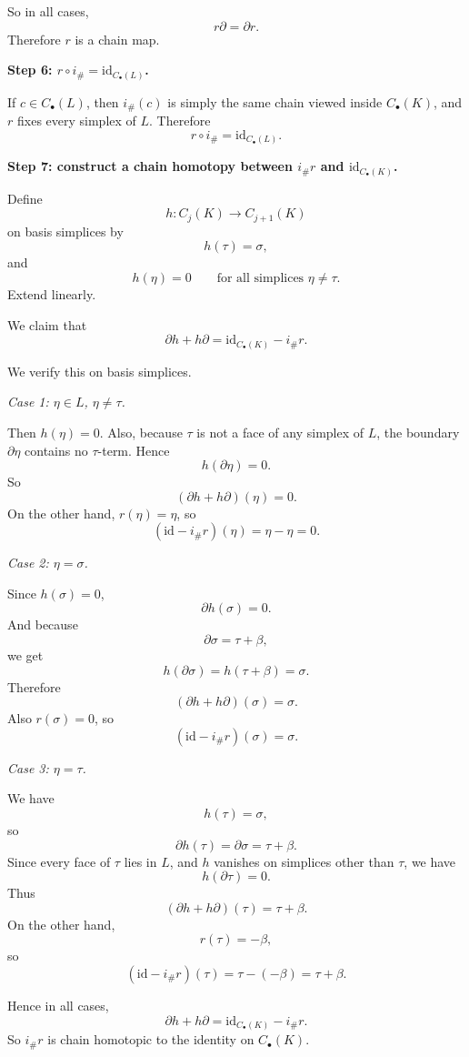 \documentclass[12pt,a4paper]{article}
\theoremstyle{notespace}
\begin{document}
So in all cases,
\[
r\partial=\partial r.
\]
Therefore \(r\) is a chain map.

\medskip

\textbf{Step 6: \(r\circ i_\#=\mathrm{id}_{C_\bullet(L)}\).}

If \(c\in C_\bullet(L)\), then \(i_\#(c)\) is simply the same chain viewed inside \(C_\bullet(K)\), and \(r\) fixes every simplex of \(L\). Therefore
\[
r\circ i_\# = \mathrm{id}_{C_\bullet(L)}.
\]

\medskip

\textbf{Step 7: construct a chain homotopy between \(i_\# r\) and \(\mathrm{id}_{C_\bullet(K)}\).}

Define
\[
h:C_j(K)\to C_{j+1}(K)
\]
on basis simplices by
\[
h(\tau)=\sigma,
\]
and
\[
h(\eta)=0
\qquad\text{for all simplices } \eta\neq \tau.
\]
Extend linearly.

We claim that
\[
\partial h + h\partial = \mathrm{id}_{C_\bullet(K)} - i_\# r.
\]

We verify this on basis simplices.

\medskip

\emph{Case 1: \(\eta\in L\), \(\eta\neq \tau\).}

Then \(h(\eta)=0\). Also, because \(\tau\) is not a face of any simplex of \(L\), the boundary \(\partial \eta\) contains no \(\tau\)-term. Hence
\[
h(\partial \eta)=0.
\]
So
\[
(\partial h+h\partial)(\eta)=0.
\]
On the other hand, \(r(\eta)=\eta\), so
\[
(\mathrm{id}-i_\# r)(\eta)=\eta-\eta=0.
\]

\medskip

\emph{Case 2: \(\eta=\sigma\).}

Since \(h(\sigma)=0\),
\[
\partial h(\sigma)=0.
\]
And because
\[
\partial \sigma=\tau+\beta,
\]
we get
\[
h(\partial \sigma)=h(\tau+\beta)=\sigma.
\]
Therefore
\[
(\partial h+h\partial)(\sigma)=\sigma.
\]
Also \(r(\sigma)=0\), so
\[
(\mathrm{id}-i_\# r)(\sigma)=\sigma.
\]

\medskip

\emph{Case 3: \(\eta=\tau\).}

We have
\[
h(\tau)=\sigma,
\]
so
\[
\partial h(\tau)=\partial \sigma=\tau+\beta.
\]
Since every face of \(\tau\) lies in \(L\), and \(h\) vanishes on simplices other than \(\tau\), we have
\[
h(\partial \tau)=0.
\]
Thus
\[
(\partial h+h\partial)(\tau)=\tau+\beta.
\]
On the other hand,
\[
r(\tau)=-\beta,
\]
so
\[
(\mathrm{id}-i_\# r)(\tau)=\tau-(-\beta)=\tau+\beta.
\]

Hence in all cases,
\[
\partial h+h\partial = \mathrm{id}_{C_\bullet(K)} - i_\# r.
\]
So \(i_\# r\) is chain homotopic to the identity on \(C_\bullet(K)\).
\end{document}
